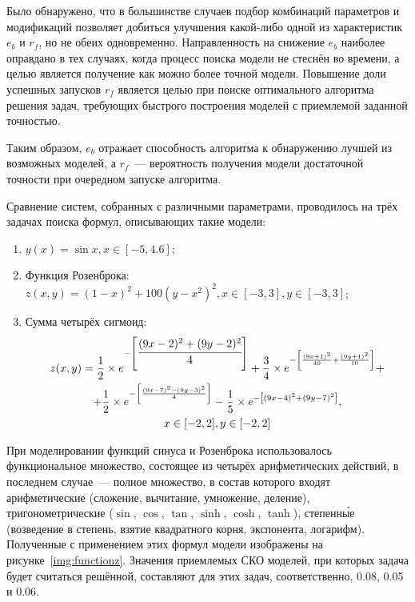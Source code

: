Было обнаружено, что в большинстве случаев подбор комбинаций параметров и модификаций позволяет добиться улучшения какой-либо одной из характеристик $e_{b}$ и $r_{f}$, но не обеих одновременно. Направленность на снижение $e_{b}$ наиболее оправдано в тех случаях, когда процесс поиска модели не стеснён во времени, а целью является получение как можно более точной модели. Повышение доли успешных запусков $r_{f}$ является целью при поиске оптимального алгоритма решения задач, требующих быстрого построения моделей с приемлемой заданной точностью.

Таким образом, $e_{b}$ отражает способность алгоритма к обнаружению лучшей из возможных моделей, а $r_{f}$~--- вероятность получения модели достаточной точности при очередном запуске алгоритма.

Сравнение систем, собранных с различными параметрами, проводилось на трёх задачах поиска формул, описывающих такие модели:
\begin{enumerate}
  \item $y(x) = \sin x, x \in [-5, 4.6]$;
  \item Функция Розенброка: $z(x, y) = {(1 - x)}^2 + 100 {(y - x^2)}^2, x \in [-3, 3], y \in [-3, 3]$;
  \item Сумма четырёх сигмоид:
    \begin{multline}
      z(x, y) = \frac{1}{2} \times e^{-\left\lbrack\cfrac{(9x-2)^2 + (9y-2)^2}{4}\right\rbrack} + \frac{3}{4} \times e^{-\left\lbrack\frac{(9x+1)^2}{49} + \frac{(9y+1)^2}{10}\right\rbrack} + \\
      + \frac{1}{2} \times e^{-\left\lbrack\frac{(9x-7)^2 - (9y-3)^2}{4}\right\rbrack} -\frac{1}{5} \times e^{-\left\lbrack(9x-4)^2 + (9y-7)^2\right\rbrack}, \\
      x \in [-2, 2], y \in [-2, 2]
    \end{multline}
\end{enumerate}

При моделировании функций синуса и Розенброка использовалось функциональное множество, состоящее из четырёх арифметических действий, в последнем случае~--- полное множество, в состав которого входят арифметические (сложение, вычитание, умножение, деление), тригонометрические ($\sin$, $\cos$, $\tan$, $\sinh$, $\cosh$, $\tanh$), степенн\'{ы}е (возведение в степень, взятие квадратного корня, экспонента, логарифм). Полученные с применением этих формул модели изображены на рисунке~\ref{img:functionz}. Значения приемлемых СКО моделей, при которых задача будет считаться решённой, составляют для этих задач, соответственно, 0.08, 0.05 и 0.06.

